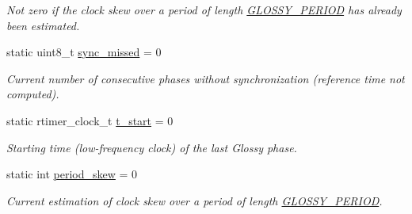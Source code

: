 \begin{DoxyCompactItemize}
\begin{DoxyCompactList}\small\item\em Not zero if the clock skew over a period of length \hyperlink{group__glossy-test-settings_ga6f68058577fdbfccbd8e50537609a5e4}{GLOSSY\_\-PERIOD} has already been estimated. \end{DoxyCompactList}\item 
\hypertarget{group__glossy-test-variables-sched-sync_ga60cbfbbe9faa75c911015ad30087933f}{
static uint8\_\-t \hyperlink{group__glossy-test-variables-sched-sync_ga60cbfbbe9faa75c911015ad30087933f}{sync\_\-missed} = 0}
\label{group__glossy-test-variables-sched-sync_ga60cbfbbe9faa75c911015ad30087933f}

\begin{DoxyCompactList}\small\item\em Current number of consecutive phases without synchronization (reference time not computed). \end{DoxyCompactList}\item 
\hypertarget{group__glossy-test-variables-sched-sync_gac9559510e6d21818f3566cd7429aaca8}{
static rtimer\_\-clock\_\-t \hyperlink{group__glossy-test-variables-sched-sync_gac9559510e6d21818f3566cd7429aaca8}{t\_\-start} = 0}
\label{group__glossy-test-variables-sched-sync_gac9559510e6d21818f3566cd7429aaca8}

\begin{DoxyCompactList}\small\item\em Starting time (low-\/frequency clock) of the last Glossy phase. \end{DoxyCompactList}\item 
\hypertarget{group__glossy-test-variables-sched-sync_ga6168dc578395ee973d219267d7bf97b5}{
static int \hyperlink{group__glossy-test-variables-sched-sync_ga6168dc578395ee973d219267d7bf97b5}{period\_\-skew} = 0}
\label{group__glossy-test-variables-sched-sync_ga6168dc578395ee973d219267d7bf97b5}

\begin{DoxyCompactList}\small\item\em Current estimation of clock skew over a period of length \hyperlink{group__glossy-test-settings_ga6f68058577fdbfccbd8e50537609a5e4}{GLOSSY\_\-PERIOD}. \end{DoxyCompactList}\end{DoxyCompactItemize}


